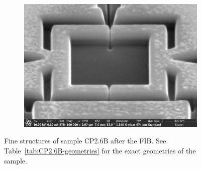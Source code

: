 \begin{figure}[ht!]
\begin{subfigure}[t]{0.3\textwidth}
	\end{subfigure}
	\hfill
	\begin{subfigure}[t]{0.3\textwidth}
		\centering
		\includegraphics[width=\textwidth]{figures/samples/CP2/CP2.6B_SEM_SQUID.jpg}
	\end{subfigure}

	\caption{Fine structures of sample CP2.6B after the FIB. See Table~\ref{tab:CP2.6B-geometries} for the exact geometries of the sample.}
	\label{fig:CP2.6B-SEM-images}
\end{figure}

